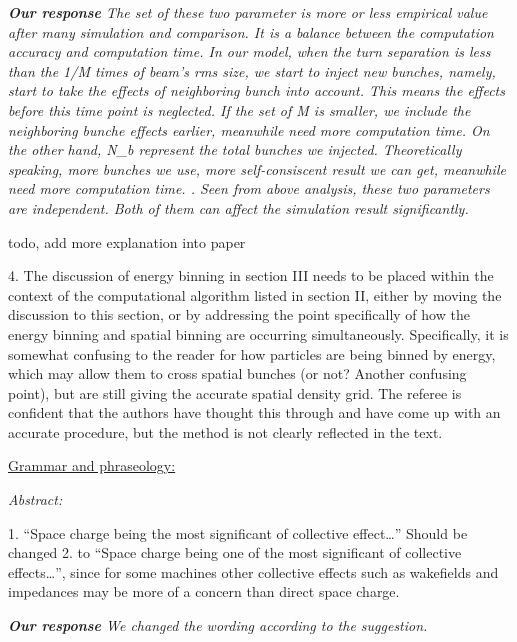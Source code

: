 \documentclass{article}
\begin{document}
{{ \vspace{+2mm}
 {\it {\bf Our response} 
   The set of these two parameter is more or less empirical value after many simulation and comparison.
   It is a balance between the computation accuracy and computation time.
   In our model, when the turn separation is less than the 1/M times of beam's rms size, 
   we start to inject new bunches, namely, start to take the effects of neighboring bunch into account. 
   This means the effects before this time point is neglected. 
   If the set of M is smaller, we include the neighboring bunche effects earlier, 
   meanwhile need more computation time.   
   On the other hand, N{\_}b represent the total bunches we injected. 
   Theoretically speaking, more bunches we use, more self-consiscent result we can get, 
   meanwhile need more computation time.   . 
   Seen from above analysis, these two parameters are independent. Both of them can affect the simulation result significantly.

   todo, add more explanation into paper
 } 
 \vspace{+2mm}

 
 4. The discussion of energy binning in section III needs to be placed within 
 the context of the computational algorithm listed in section II, either by 
 moving the discussion to this section, or by addressing the point 
 specifically of how the energy binning and spatial binning are occurring 
 simultaneously. Specifically, it is somewhat confusing to the reader for how 
 particles are being binned by energy, which may allow them to cross spatial 
 bunches (or not? Another confusing point), but are still giving the accurate 
 spatial density grid. The referee is confident that the authors have thought 
 this through and have come up with an accurate procedure, but the method is 
 not clearly reflected in the text. 
 
 \underline {Grammar and phraseology: }
 
 \textit{Abstract: }
 
 1. ``Space charge being the most significant of collective effect{\ldots}'' 
 Should be changed 2. to ``Space charge being one of the most significant of 
 collective effects{\ldots}'', since for some machines other collective 
 effects such as wakefields and impedances may be more of a concern than 
 direct space charge. 
 

\vspace{+2mm}
 {\it {\bf Our response} We changed the wording according to the suggestion.
\vspace{+2mm}

}}}
\end{document}
